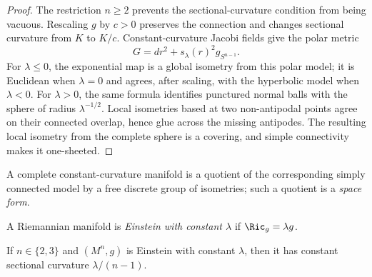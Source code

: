 \begin{proof}
\sketch
{}
The restriction $n\ge2$ prevents the sectional-curvature condition from
being vacuous. Rescaling $g$ by $c>0$ preserves the connection and
changes sectional curvature from $K$ to $K/c$. Constant-curvature
Jacobi fields give the polar metric
\begin{equation}\label{modelpolar}
  G=dr^2+s_\lambda(r)^2g_{S^{n-1}}.
\end{equation}
For $\lambda\le0$, the exponential map is a global isometry from this
polar model; it is Euclidean when $\lambda=0$ and agrees, after scaling,
with the hyperbolic model when $\lambda<0$. For $\lambda>0$, the same
formula identifies punctured normal balls with the sphere of radius
$\lambda^{-1/2}$. Local isometries based at two non-antipodal points
agree on their connected overlap, hence glue across the missing
antipodes. The resulting local isometry from the complete sphere is a
covering, and simple connectivity makes it one-sheeted.
\end{proof}

A complete constant-curvature manifold is a quotient of the
corresponding simply connected model by a free discrete group of
isometries; such a quotient is a \emph{space form}.


\begin{definition}
\label{def:einstein-manifold}
\leanok



A Riemannian manifold is \emph{Einstein with constant $\lambda$} if
$\Ric_g=\lambda g$.
\end{definition}

\begin{example}
\label{ex:einstein-dimension-2-3}
\leanok



If $n\in\{2,3\}$ and $(M^n,g)$ is Einstein with constant $\lambda$,
then it has constant sectional curvature $\lambda/(n-1)$.
\end{example}


